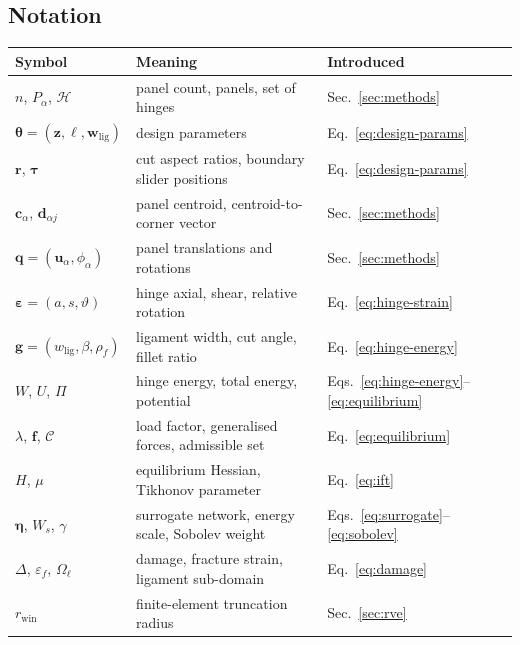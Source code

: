 \documentclass[pdflatex,sn-mathphys-num]{sn-jnl}%
\theoremstyle{thmstyleone}%
\theoremstyle{thmstyletwo}%
\theoremstyle{thmstylethree}%
\newcommand{\wlig}{w_{\mathrm{lig}}}
\newcommand{\epsh}{\bm{\varepsilon}}
\begin{document}
\begin{appendices}

\section{Notation}\label{sec:notation}

\begin{table}[h!]
\centering
\small
\begin{tabular}{lll}
\toprule
\textbf{Symbol} & \textbf{Meaning} & \textbf{Introduced} \\
\midrule
$n$, $P_\alpha$, $\mathcal{H}$        & panel count, panels, set of hinges        & Sec.~\ref{sec:methods} \\
$\bm{\theta}=(\bm z,\bm\ell,\bm w_{\mathrm{lig}})$ & design parameters            & Eq.~\eqref{eq:design-params} \\
$\bm{r}$, $\bm{\tau}$                 & cut aspect ratios, boundary slider positions & Eq.~\eqref{eq:design-params} \\
$\bm{c}_\alpha$, $\bm{d}_{\alpha j}$  & panel centroid, centroid-to-corner vector & Sec.~\ref{sec:methods} \\
$\bm{q}=(\bm u_\alpha,\phi_\alpha)$   & panel translations and rotations          & Sec.~\ref{sec:methods} \\
$\epsh=(a,s,\vartheta)$               & hinge axial, shear, relative rotation     & Eq.~\eqref{eq:hinge-strain} \\
$\bm{g}=(\wlig,\beta,\rho_f)$         & ligament width, cut angle, fillet ratio   & Eq.~\eqref{eq:hinge-energy} \\
$W$, $U$, $\Pi$                       & hinge energy, total energy, potential     & Eqs.~\eqref{eq:hinge-energy}--\eqref{eq:equilibrium} \\
$\lambda$, $\bm f$, $\mathcal{C}$     & load factor, generalised forces, admissible set & Eq.~\eqref{eq:equilibrium} \\
$H$, $\mu$                            & equilibrium Hessian, Tikhonov parameter   & Eq.~\eqref{eq:ift} \\
$\bm{\eta}$, $W_s$, $\gamma$          & surrogate network, energy scale, Sobolev weight & Eqs.~\eqref{eq:surrogate}--\eqref{eq:sobolev} \\
$\Delta$, $\varepsilon_f$, $\Omega_\ell$  & damage, fracture strain, ligament sub-domain & Eq.~\eqref{eq:damage} \\
$r_{\mathrm{win}}$                    & finite-element truncation radius          & Sec.~\ref{sec:rve} \\

\end{tabular}
\end{table}
\end{appendices}
\end{document}
